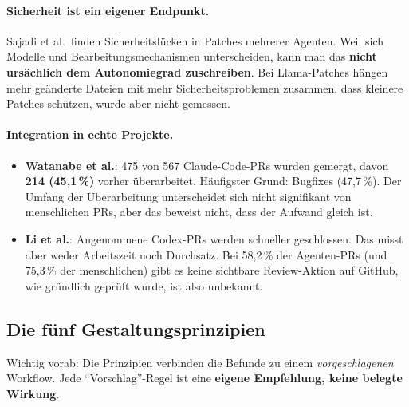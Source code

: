 \documentclass[11pt,a4paper,parskip=half]{scrartcl}
\begin{document}
\paragraph{Sicherheit ist ein eigener Endpunkt.}
Sajadi et al.\ finden Sicherheitslücken in Patches mehrerer Agenten. Weil sich Modelle und Bearbeitungsmechanismen unterscheiden, kann man das \textbf{nicht ursächlich dem Autonomiegrad zuschreiben}. Bei Llama-Patches hängen mehr geänderte Dateien mit mehr Sicherheitsproblemen zusammen, dass kleinere Patches schützen, wurde aber nicht gemessen.

\paragraph{Integration in echte Projekte.}
\begin{itemize}
\item \textbf{Watanabe et al.}: 475 von 567 Claude-Code-PRs wurden gemergt, davon \textbf{214 (45,1\,\%)} vorher überarbeitet. Häufigster Grund: Bugfixes (47,7\,\%). Der Umfang der Überarbeitung unterscheidet sich nicht signifikant von menschlichen PRs, aber das beweist nicht, dass der Aufwand gleich ist.
\item \textbf{Li et al.}: Angenommene Codex-PRs werden schneller geschlossen. Das misst aber weder Arbeitszeit noch Durchsatz. Bei 58,2\,\% der Agenten-PRs (und 75,3\,\% der menschlichen) gibt es keine sichtbare Review-Aktion auf GitHub, wie gründlich geprüft wurde, ist also unbekannt.
\end{itemize}

\subsection{Die fünf Gestaltungsprinzipien}
Wichtig vorab: Die Prinzipien verbinden die Befunde zu einem \emph{vorgeschlagenen} Workflow. Jede \enquote{Vorschlag}-Regel ist eine \textbf{eigene Empfehlung, keine belegte Wirkung}.
\end{document}
